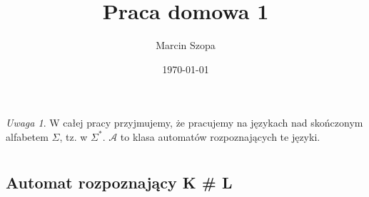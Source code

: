 \documentclass{article}
\title{Praca domowa 1}
\author{Marcin Szopa}
\date{\today}
\theoremstyle{definition}
\theoremstyle{remark}
\newtheorem*{remark}{Uwaga}
\begin{document}
\maketitle

\begin{remark}
    W całej pracy przyjmujemy, że pracujemy na językach nad skończonym alfabetem \(\Sigma\), tz. w \( \Sigma^* \). \(\mathcal{A}\) to klasa automatów rozpoznających te języki.
\end{remark}

\section{}

\subsection{Automat rozpoznający K \# L}
\end{document}
